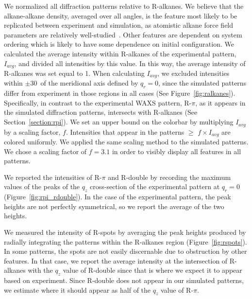 \documentclass[journal=jpcbfk,manuscript=article]{achemso}
\begin{document}
  We normalized all diffraction patterns relative to R-alkanes. We believe that
  the alkane-alkane density, averaged over all angles, is the feature most likely
  to be replicated between experiment and simulation, as atomistic alkane force
  field parameters are relatively well-studied~\cite{wang_development_2004}.
  Other features are dependent on system ordering which is likely to have some
  dependence on initial configuration.  We calculated the average intensity
  within R-alkanes of the experimental pattern, $I_{avg}$, and divided all
  intensities by this value. In this way, the average intensity of R-alkanes was
  set equal to 1. When calculating $I_{avg}$, we excluded intensities within
  $\pm$30\degree~of the meridional axis defined by $q_r=0$, since the simulated
  patterns differ from experiment in those regions in all cases (See
  Figure~\ref{fig:ralkanes}). Specifically, in contrast to the experimental WAXS
  pattern, R-$\pi$, as it appears in the simulated diffraction patterns,
  intersects with R-alkanes (See Section~\ref{section:rpi}). We set an upper bound
  on the colorbar by multiplying $I_{avg}$ by a scaling factor, $f$.  Intensities
  that appear in the patterns $\geq$ $f\times I_{avg}$ are colored uniformly.  We
  applied the same scaling method to the simulated patterns. We chose a scaling
  factor of $f=3.1$ in order to visibly display all features in all patterns.

  We reported the intensities of R-$\pi$ and R-double by recording the maximum values
  of the peaks of the $q_z$ cross-section of the experimental pattern at $q_r=0$ 
  (Figure~\ref{fig:rpi_rdouble}). In the case of the experimental pattern, the peak
  heights are not perfectly symmetrical, so we report the average of the two heights.

  We measured the intensity of R-spots by averaging the peak heights produced
  by radially integrating the patterns within the R-alkanes region
  (Figure~\ref{fig:rspots}). In some patterns, the spots are not easily
  discernable due to obstruction by other features. In that case, we report the
  average intensity at the intersection of R-alkanes with the $q_z$ value of
  R-double since that is where we expect it to appear based on experiment. Since
  R-double does not appear in our simulated patterns, we estimate where it should
  appear as half of the $q_z$ value of R-$\pi$.
\end{document}
